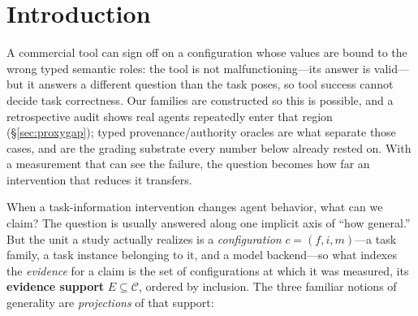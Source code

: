 \documentclass{article}
\begin{document}
\begin{abstract}
family---is measured with DeepSeek-V4-Pro at $k$=\StatArmTwoK{} (\StatArmTwoEpisodes{} episodes): $\StatArmTwoDelta$ points, \StatArmTwoImprove{} instances improving to \StatArmTwoDecline{} declining, band $\StatArmTwoBandLo$ to $\StatArmTwoBandHi$, $p$=\StatArmTwoSignP{}. Joint transfer is \emph{not established} either---not the same claim as no effect, on a panel where \StatArmTwoFloorN{} of twelve instances cannot express a difference at all. A second, orthogonal axis---a four-layer \emph{measurement-validity audit} (capability, sampling, execution, artifact integrity)---caught a threat at every layer that would have changed the scientific conclusion. An external probe (Terminal-Bench 2.0$\to$2.1, 26 repairs) finds it relevant but incompletely covering (1 direct, 21 partial, 4 outside). Our instances test existence, recurrence, and transfer direction rather than estimate population pass rates.
\end{abstract}

\section{Introduction}
\label{sec:intro}
A commercial tool can sign off on a configuration whose values are bound to the wrong typed semantic roles: the tool is not malfunctioning---its answer is valid---but it answers a different question than the task poses, so tool success cannot decide task correctness. Our families are constructed so this is possible, and a retrospective audit shows real agents repeatedly enter that region (\S\ref{sec:proxygap}); typed provenance/authority oracles are what separate those cases, and are the grading substrate every number below already rested on. With a measurement that can see the failure, the question becomes how far an intervention that reduces it transfers.

When a task-information intervention changes agent behavior, what can we claim? The question is usually answered along one implicit axis of ``how general.'' But the unit a study actually realizes is a \emph{configuration} $c=(f,i,m)$---a task family, a task instance belonging to it, and a model backend---so what indexes the \emph{evidence} for a claim is the set of configurations at which it was measured, its \textbf{evidence support} $E\subseteq\mathcal{C}$, ordered by inclusion. The three familiar notions of generality are \emph{projections} of that support:
\end{document}
